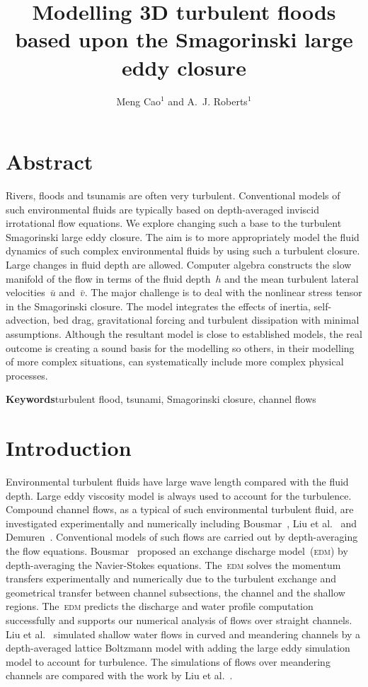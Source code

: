 \documentclass[twocolumn]{afmc_art}
\title{Modelling 3D turbulent floods based upon the Smagorinski large eddy closure}
\author{Meng Cao$^1$ and A.~J. Roberts$^1$}
\affiliation{$^1$School of Mathematical Science\\
                Adelaide University, South Australia 5005, Australia\\[5pt]
            }
\begin{document}
    
\maketitle

\section{Abstract}
Rivers, floods and tsunamis are often very turbulent. Conventional models of such environmental fluids are typically based on depth-averaged inviscid irrotational flow equations. We explore changing such a base to the turbulent Smagorinski large eddy closure. The aim is to more appropriately model the fluid dynamics of such complex environmental fluids by using such a turbulent closure. Large changes in fluid depth are allowed. Computer algebra constructs the slow manifold of the flow in terms of the fluid depth~$h$ and the mean turbulent lateral velocities~$\bar u$ and~$\bar v$. The major challenge is to deal with the nonlinear stress tensor in the Smagorinski closure. The model integrates the effects of inertia, self-advection, bed drag, gravitational forcing and turbulent dissipation with minimal assumptions. Although the resultant model is close to established models, the real outcome is creating a sound basis for the modelling so others, in their modelling of more complex situations, can systematically include more complex physical processes.

\textbf{Keywords}\quad turbulent flood, tsunami, Smagorinski closure, channel flows

\section{Introduction}

Environmental turbulent fluids have large wave length compared with the fluid depth.
Large eddy viscosity model is always used to account for the turbulence.
Compound channel flows, as a typical of such environmental turbulent fluid, are investigated experimentally and numerically including Bousmar~\cite{Bousmar2002}, Liu et al.~\cite{Liu2009} and Demuren~\cite{Demuren1993}.
Conventional models of such flows are carried out by depth-averaging the flow equations. 
Bousmar~\cite{Bousmar2002} proposed an exchange discharge model~(\textsc{edm}) by depth-averaging the Navier-Stokes equations.
The~\textsc{edm} solves the momentum transfers experimentally and numerically due to the turbulent exchange and geometrical transfer between channel subsections, the channel and the shallow regions.
The~\textsc{edm} predicts the discharge and water profile computation successfully and supports our numerical analysis of flows over straight channels. 
Liu et al.~\cite{Liu2009} simulated shallow water flows in curved and meandering channels by a depth-averaged lattice Boltzmann model with adding the large eddy simulation model to account for turbulence.
The simulations of flows over meandering channels are compared  with the work by Liu et al.~\cite{Liu2009}. 
\end{document}
